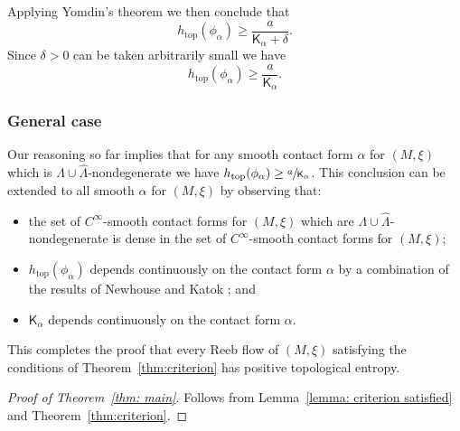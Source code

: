 \documentclass[JEP,XML,SOM,Unicode,NoFloatCountersInSection]{cedram}
\renewcommand{\top}{\mathrm{top}}
\theoremstyle{plain}
\theoremstyle{definition}
\numberwithin{equation}{subsection}
\begin{document}
Applying Yomdin's theorem \cite{Yomdin} we then conclude that
\begin{equation}
h_{\top}(\phi_\alpha) \geq \frac{a}{\mathsf{K}_\alpha + \delta}.
\end{equation}
Since $\delta>0$ can be taken arbitrarily small we have
\begin{equation}
h_{\top}(\phi_\alpha) \geq \frac{a}{\mathsf{K}_\alpha}.
\end{equation}

\subsubsection*{General case}
Our reasoning so far implies that for any smooth contact form $\alpha$ for $(M,\xi)$ which is $\Lambda\cup\widehat{\Lambda}$-nondegenerate we have $h_{\top}(\phi_\alpha) \geq \sfrac{a}{\mathsf{K}_\alpha}$. This conclusion can be extended to all smooth $\alpha$ for $(M,\xi)$ by observing that:
\begin{itemize}
\item the set of $C^\infty$-smooth contact forms for $(M,\xi)$ which are $\Lambda\cup\widehat{\Lambda}$-nondegenerate is dense in the set of $C^\infty$-smooth contact forms for $(M,\xi)$;
\item $h_{\top}(\phi_\alpha)$ depends continuously on the contact form $\alpha$ by a combination of the results of Newhouse \cite{New} and Katok \cite{Katok}; and
\item $\mathsf{K}_\alpha$ depends continuously on the contact form $\alpha$.
\end{itemize}

This completes the proof that every Reeb flow of $(M,\xi)$ satisfying the conditions of Theorem~\ref{thm:criterion} has positive topological entropy.

\begin{proof}[Proof of Theorem~\ref{thm: main}]
Follows from Lemma~\ref{lemma: criterion satisfied} and Theorem~\ref{thm:criterion}.
\end{proof}



\end{document}
